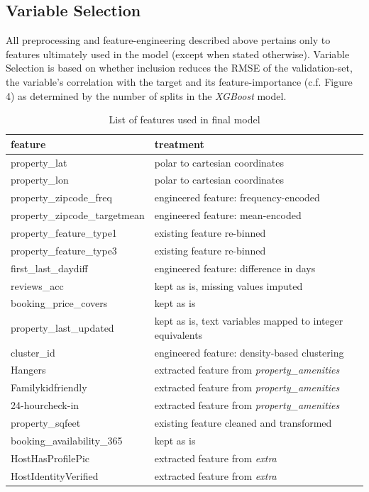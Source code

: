 \documentclass[11pt, oneside]{article}   	%
\begin{document}
\subsection{Variable Selection}
All preprocessing and feature-engineering described above pertains only to features ultimately used in the model (except when  stated otherwise). Variable Selection is based on whether inclusion reduces the RMSE of the validation-set, the variable's  correlation with the target and its feature-importance (c.f. Figure 4) as determined by the number of splits in the \textit{XGBoost} model.
\begin{table}
\begin{center}
\begin{tabular}{l | l }
feature&treatment\\
\hline
property\_lat&polar to cartesian coordinates\\
property\_lon&polar to cartesian coordinates\\
property\_zipcode\_freq&engineered feature: frequency-encoded\\
property\_zipcode\_targetmean&engineered feature: mean-encoded\\
property\_feature\_type1&existing feature re-binned\\
property\_feature\_type3&existing feature re-binned\\
first\_last\_daydiff&engineered feature: difference in days\\
reviews\_acc&kept as is, missing values imputed\\
booking\_price\_covers&kept as is\\
property\_last\_updated&kept as is, text variables mapped to integer equivalents\\
cluster\_id&engineered feature: density-based clustering\\
Hangers&extracted feature from \textit{property\_amenities}\\
Familykidfriendly&extracted feature from \textit{property\_amenities}\\
24-hourcheck-in&extracted feature from \textit{property\_amenities}\\
property\_sqfeet&existing feature cleaned and transformed\\
booking\_availability\_365&kept as is\\
HostHasProfilePic&extracted feature from \textit{extra}\\
HostIdentityVerified&extracted feature from \textit{extra}
\end{tabular}
\caption{\label{demo-table}List of features used in final model}
\end{center}
\end{table}
\end{document}
